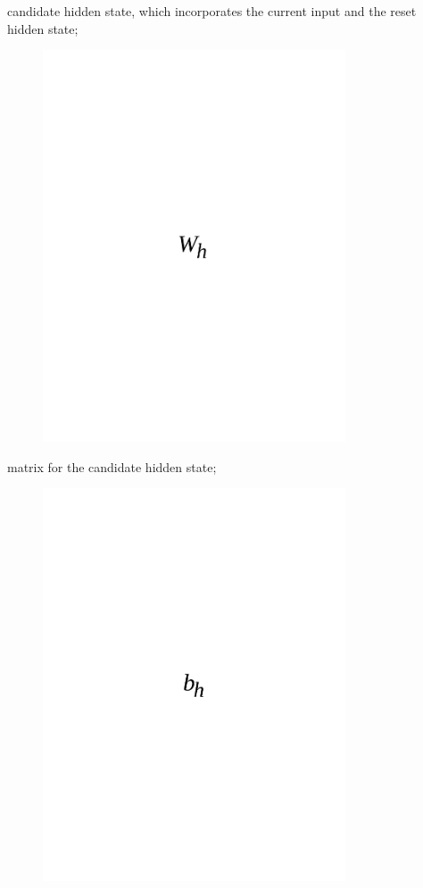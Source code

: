candidate hidden state, which incorporates the current input and the
reset hidden state;
\begin{figure}[H]
	\centering
	\includegraphics[width=0.8\textwidth]{media/ict/image73}
	\caption*{}
\end{figure}

matrix for the candidate hidden state;
\begin{figure}[H]
	\centering
	\includegraphics[width=0.8\textwidth]{media/ict/image74}
	\caption*{}
\end{figure}

